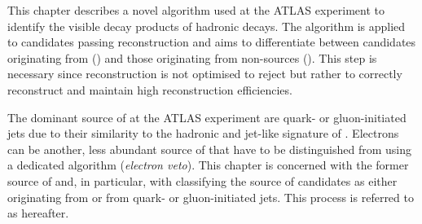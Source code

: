 This chapter describes a novel algorithm used at the ATLAS experiment to
identify the visible decay products of hadronic \taulepton decays. The algorithm
is applied to \tauhadvis candidates passing \tauhadvis reconstruction and aims
to differentiate between candidates originating from \tauhad (\truetauhadvis)
and those originating from non-\tauhad sources (\faketauhadvis). This step is
necessary since \tauhadvis reconstruction is not optimised to reject
\faketauhadvis but rather to correctly reconstruct \truetauhadvis and maintain
high \tauhadvis reconstruction efficiencies.

The dominant source of \faketauhadvis at the ATLAS experiment are quark- or
gluon-initiated jets due to their similarity to the hadronic and jet-like
signature of \tauhadvis. Electrons can be another, less abundant source of
\faketauhadvis that have to be distinguished from \truetauhadvis using a
dedicated algorithm (\emph{electron veto}). This chapter is concerned with the
former source of \faketauhadvis and, in particular, with classifying the source
of \tauhadvis candidates as either originating from \tauhad or from quark- or
gluon-initiated jets. This process is referred to as \tauid hereafter.

